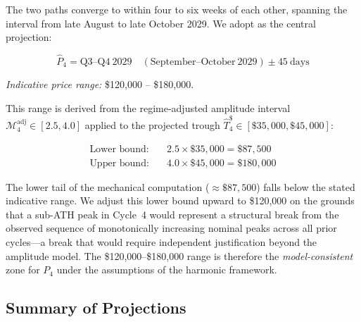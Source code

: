 The two paths converge to within four to six weeks of each other, spanning the
interval from late August to late October 2029. We adopt as the central
projection:

\begin{equation}
  \hat{P}_4 = \text{Q3--Q4}\ 2029 \quad (\text{September--October}\ 2029)
              \pm 45\ \text{days}
  \label{eq:p4_projection}
\end{equation}

\medskip
\noindent\textit{Indicative price range:} \$120,000 -- \$180,000.

This range is derived from the regime-adjusted amplitude interval
$\mathcal{M}_4^{\text{adj}} \in [2.5, 4.0]$ applied to the projected trough
$\hat{T}_4^{\$} \in [\$35{,}000, \$45{,}000]$:

\begin{align}
  \text{Lower bound:} &\quad 2.5 \times \$35{,}000 = \$87{,}500 \\
  \text{Upper bound:} &\quad 4.0 \times \$45{,}000 = \$180{,}000
  \label{eq:p4_price}
\end{align}

The lower tail of the mechanical computation ($\approx\$87{,}500$) falls below
the stated indicative range. We adjust this lower bound upward to
\$120,000 on the grounds that a sub-ATH peak in Cycle~4 would represent a
structural break from the observed sequence of monotonically increasing nominal
peaks across all prior cycles---a break that would require independent
justification beyond the amplitude model. The \$120,000--\$180,000 range is
therefore the \textit{model-consistent} zone for $P_4$ under the assumptions
of the harmonic framework.

\subsection{Summary of Projections}


